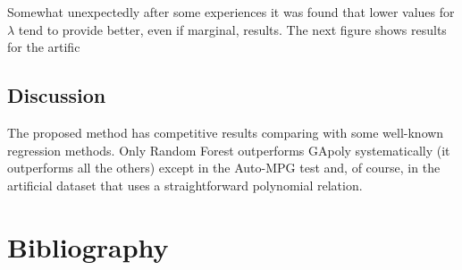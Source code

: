 \documentclass[a4paper, 12pt]{article}
\begin{document}
Somewhat unexpectedly after some experiences it was found that lower values for $\lambda$ tend to provide better, even if marginal, results. The next figure shows results for the artific

\subsection{Discussion}

The proposed method has competitive results comparing with some well-known regression methods. Only Random Forest outperforms GApoly systematically (it outperforms all the others) except in the Auto-MPG test and, of course, in the artificial dataset that uses a straightforward polynomial relation. 



\section{Bibliography}



\end{document}
